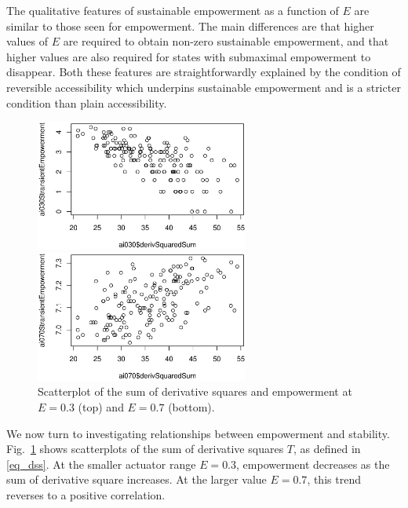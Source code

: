\documentclass[conference]{IEEEtran}
\newcommand{\sumderivsquares}{\ensuremath{T}}
\newcommand{\impactstrength}{\ensuremath{E}}
\begin{document}
The qualitative features of sustainable empowerment as a function of
$\impactstrength$ are similar to those seen for empowerment. The main differences
are that higher values of $\impactstrength$ are required to obtain non-zero
sustainable empowerment, and that higher values are also required for
states with submaximal empowerment to disappear. Both these features
are straightforwardly explained by the condition of reversible
accessibility which underpins sustainable empowerment and is a
stricter condition than plain accessibility.


\begin{figure}

  \begin{center}

    \includegraphics[width=7cm]{n08_full_small_corr_dss_emp_ai030.eps}

    \includegraphics[width=7cm]{n08_full_small_corr_dss_emp_ai070.eps}

  \end{center}

  \caption{Scatterplot of the sum of derivative squares and
    empowerment at $\impactstrength = 0.3$ (top) and $\impactstrength = 0.7$ (bottom).}
  \label{fig_dssemp}

\end{figure}

We now turn to investigating relationships between empowerment and
stability. Fig.~\ref{fig_dssemp} shows scatterplots of the sum of
derivative squares $\sumderivsquares$, as defined in \eqref{eq_dss}.
At the smaller actuator range $\impactstrength = 0.3$, empowerment decreases as the
sum of derivative square increases. At the larger value $\impactstrength = 0.7$,
this trend reverses to a positive correlation.
\end{document}
